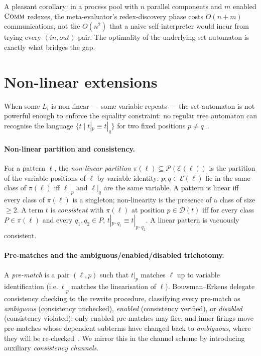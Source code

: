 \documentclass[11pt]{article}
\theoremstyle{plain}
\theoremstyle{definition}
\theoremstyle{remark}
\newcommand{\dom}{\mathcal{D}}
\newcommand{\edges}{\mathcal{E}}
\begin{document}
A pleasant corollary: in a process pool with $n$ parallel components and
$m$ enabled $\textsc{Comm}$ redexes, the meta-evaluator's redex-discovery
phase costs $O(n + m)$ communications, not the $O(n^{2})$ that a naive
self-interpreter would incur from trying every $(\mathit{in},
\mathit{out})$ pair. The optimality of the underlying set automaton is
exactly what bridges the gap.

\section{Non-linear extensions}\label{sec:nonlinear}

When some $L_{i}$ is non-linear --- some variable repeats --- the set
automaton is not powerful enough to enforce the equality constraint:
no regular tree automaton can recognise the language $\{t \mid t|_{p}
\equiv t|_{q}\}$ for two fixed positions $p \neq q$~\cite{Comon2007}.

\paragraph{Non-linear partition and consistency.}
For a pattern $\ell$, the \emph{non-linear partition}
$\pi(\ell) \subseteq \mathcal{P}(\edges(\ell))$ is the partition of the
variable positions of $\ell$ by variable identity: $p, q \in \edges(\ell)$
lie in the same class of $\pi(\ell)$ iff $\ell|_{p}$ and $\ell|_{q}$
are the same variable. A pattern is linear iff every class of
$\pi(\ell)$ is a singleton; non-linearity is the presence of a class of
size $\ge 2$. A term $t$ is \emph{consistent} with $\pi(\ell)$ at
position $p \in \dom(t)$ iff for every class $P \in \pi(\ell)$ and
every $q_{1}, q_{2} \in P$, $t|_{p \cdot q_{1}} \equiv t|_{p \cdot
q_{2}}$. A linear pattern is vacuously consistent.

\paragraph{Pre-matches and the ambiguous/enabled/disabled trichotomy.}
A \emph{pre-match} is a pair $(\ell, p)$ such that $t|_{p}$ matches
$\ell$ up to variable identification (i.e.\ $t|_{p}$ matches the
linearisation of $\ell$). Bouwman--Erkens delegate consistency
checking to the rewrite procedure, classifying every pre-match as
\emph{ambiguous} (consistency unchecked), \emph{enabled} (consistency
verified), or \emph{disabled} (consistency violated); only enabled
pre-matches may fire, and inner firings move pre-matches whose
dependent subterms have changed back to \emph{ambiguous}, where they
will be re-checked~\cite[Algorithm~2]{BouwmanErkens2022}. We mirror
this in the channel scheme by introducing auxiliary \emph{consistency
channels}.
\end{document}
